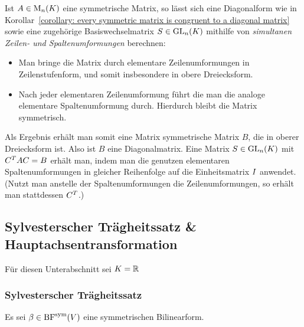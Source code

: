 Ist $A \in \operatorname{M}_{n}(K)$ eine symmetrische Matrix, so lässt sich eine Diagonalform wie in Korollar~\ref{corollary: every symmetric matrix is congruent to a diagonal matrix} sowie eine zugehörige Basiswechselmatrix $S \in \operatorname{GL}_{n}(K)$ mithilfe von \emph{simultanen Zeilen- und Spaltenumformungen} berechnen:
\begin{itemize}
  \item
    Man bringe die Matrix durch elementare Zeilenumformungen in Zeilenstufenform, und somit insbesondere in obere Dreiecksform.
  \item
    Nach jeder elementaren Zeilenumformung führt die man die analoge elementare Spaltenumformung durch.
    Hierdurch bleibt die Matrix symmetrisch.
\end{itemize}
Als Ergebnis erhält man somit eine Matrix symmetrische Matrix $B$, die in oberer Dreiecksform ist.
Also ist $B$ eine Diagonalmatrix.
Eine Matrix $S \in \operatorname{GL}_{n}(K)$ mit $C^T A C = B$ erhält man, indem man die genutzen elementaren Spaltenumformungen in gleicher Reihenfolge auf die Einheitsmatrix $I$ anwendet.
(Nutzt man anstelle der Spaltenumformungen die Zeilenumformungen, so erhält man stattdessen $C^T$.)






\subsection{Sylvesterscher Trägheitssatz \& Hauptachsentransformation}

Für diesen Unterabschnitt sei $K = \mathbb{R}$



\subsubsection{Sylvesterscher Trägheitssatz}

Es sei $\beta \in \operatorname{BF}^{\operatorname{sym}}(V)$ eine symmetrischen Bilinearform.

